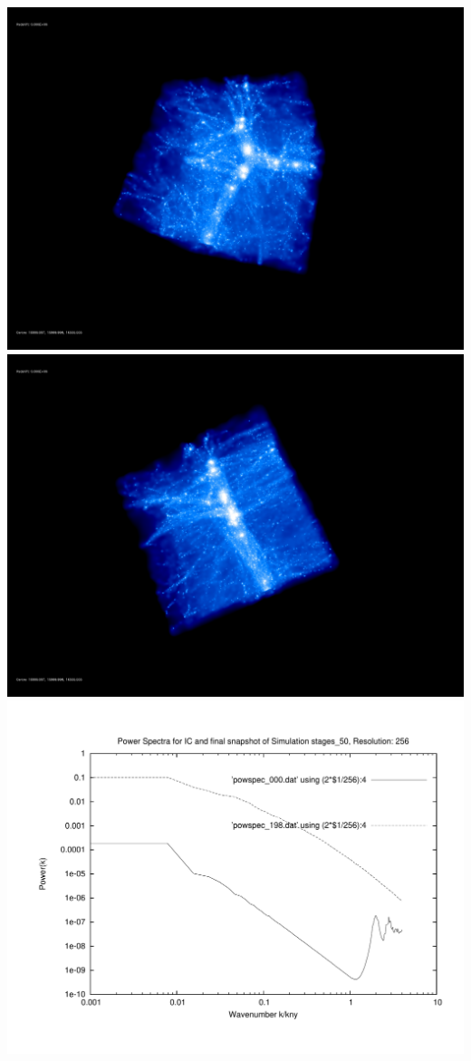 \includegraphics[scale=0.1]{r256/stages_50/rotate_00074.jpg} 
\includegraphics[scale=0.1]{r256/stages_50/rotate_00131.jpg}  \\

\includegraphics[scale=0.5]{r256/stages_50/plot_powspec_stages_50}

